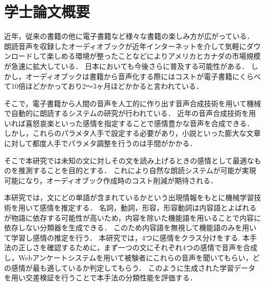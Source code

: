 \chapter*{学士論文概要}

近年，従来の書籍の他に電子書籍など様々な書籍の楽しみ方が広がっている．
朗読音声を収録したオーディオブックが近年インターネットを介して気軽にダウンロードして楽しめる環境が整ったことなどによりアメリカとカナダの市場規模が急速に拡大している．
日本においても今後さらに普及する可能性がある．
しかし，オーディオブックは書籍から音声化する際にはコストが電子書籍にくらべて10倍ほどかかっており2〜3ヶ月ほどかかると言われている．

そこで，電子書籍から人間の音声を人工的に作り出す音声合成技術を用いて機械で自動的に朗読するシステムの研究が行われている．
近年の音声合成技術を用いれば喜怒哀楽といった感情を指定することで感情豊かな音声を合成できる．
しかし，これらのパラメタ人手で設定する必要があり，小説といった膨大な文章に対して都度人手でパラメタ調整を行うのは手間がかかる．

そこで本研究では未知の文に対しその文を読み上げるときの感情として最適なものを推測することを目的とする．
これにより自然な朗読システムが可能が実現可能になり，オーディオブック作成時のコスト削減が期待される．

本研究では，文にどの単語が含まれているかという出現情報をもとに機械学習技術を用いて感情を推定する．
名詞，動詞，形容，形容動詞は内容語とよばれるが物語に依存する可能性が高いため，内容を除いた機能語を用いることで内容に依存しない分類器を生成できる．
このため内容語を無視して機能語のみを用いて学習し感情の推定を行う．
本研究では，4つに感情をクラス分けをする.
本手法の正しさを確認するために，まず一つの文にそれぞれ4つの感情で音声を合成し，Webアンケートシステムを用いて被験者にこれらの音声を聞いてもらい，どの感情が最も適しているか判定してもらう．
このように生成された学習データを用い交差検証を行うことで本手法の分類性能を評価する．
